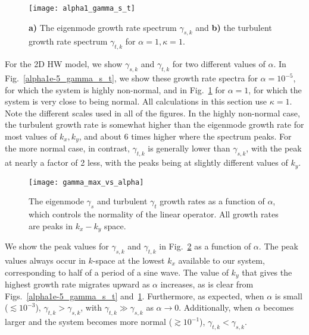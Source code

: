 \documentclass[twocolumn,showkeys,superscriptaddress]{revtex4}
\begin{document}
\begin{figure}
\centerline{\texttt{[image: alpha1\_gamma\_s\_t]}}
\caption{{\bf a)} The eigenmode growth rate spectrum $\gamma_{s,k}$ and {\bf b)} the turbulent growth rate spectrum $\gamma_{t,k}$ for $\alpha = 1, \kappa=1$.}
\label{alpha1_gamma_s_t}
\end{figure}

For the 2D HW model, we show
$\gamma_{s,k}$ and $\gamma_{t,k}$ for two different values of $\alpha$. In Fig.~\ref{alpha1e-5_gamma_s_t}, we show these growth rate spectra for $\alpha = 10^{-5}$, for which the system is
highly non-normal, and in Fig.~\ref{alpha1_gamma_s_t} for $\alpha = 1$, for which the system is very close to being normal. All calculations in this section use $\kappa=1$. 
Note the different scales used in all of the figures. In the highly
non-normal case, the turbulent growth rate is somewhat higher than the eigenmode growth rate for most values of $k_x,k_y$, and about 6 times higher where the spectrum peaks. For the more normal
case, in contrast, $\gamma_{t,k}$ is generally lower than $\gamma_{s,k}$, with the peak at nearly a factor of 2 less, with the peaks being at slightly different values of $k_y$.

\begin{figure}
\centerline{\texttt{[image: gamma\_max\_vs\_alpha]}}
\caption{The eigenmode $\gamma_{s}$ and turbulent $\gamma_{t}$ growth rates as a function of $\alpha$, which controls the normality of the linear operator. All growth rates are peaks in $k_x-k_y$ space.}
\label{gamma_max_vs_alpha}
\end{figure}

We show the peak values for $\gamma_{s,k}$ and $\gamma_{t,k}$ in Fig.~\ref{gamma_max_vs_alpha} as a function of $\alpha$. The peak values always occur in $k$-space
at the lowest $k_x$ available to our system, corresponding to half of a period of a sine wave. The value of $k_y$ that gives the highest growth rate migrates upward as $\alpha$ increases,
as is clear from Figs.~\ref{alpha1e-5_gamma_s_t} and~\ref{alpha1_gamma_s_t}. Furthermore, as expected, when $\alpha$ is small ($\lesssim 10^{-3}$), $\gamma_{t,k} > \gamma_{s,k}$, with
$\gamma_{t,k} \gg \gamma_{s,k}$ as $\alpha \to 0$. Additionally, when $\alpha$ becomes larger and the system becomes more normal ($\gtrsim 10^{-1}$), $\gamma_{t,k} < \gamma_{s,k}$.
\end{document}

